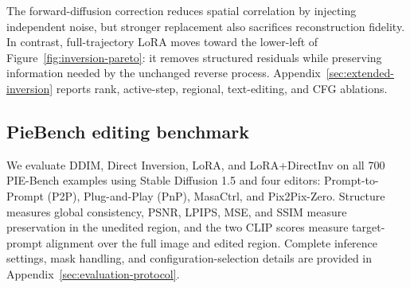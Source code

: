 \documentclass{article} %
\begin{document}
The forward-diffusion correction reduces spatial correlation by injecting independent noise, but stronger replacement also sacrifices reconstruction fidelity. In contrast, full-trajectory LoRA moves toward the lower-left of Figure~\ref{fig:inversion-pareto}: it removes structured residuals while preserving information needed by the unchanged reverse process. Appendix~\ref{sec:extended-inversion} reports rank, active-step, regional, text-editing, and CFG ablations.
\subsection{PieBench editing benchmark}
We evaluate DDIM, Direct Inversion, LoRA, and LoRA+DirectInv on all 700 PIE-Bench examples using Stable Diffusion 1.5 and four editors: Prompt-to-Prompt (P2P), Plug-and-Play (PnP), MasaCtrl, and Pix2Pix-Zero. Structure measures global consistency, PSNR, LPIPS, MSE, and SSIM measure preservation in the unedited region, and the two CLIP scores measure target-prompt alignment over the full image and edited region. Complete inference settings, mask handling, and configuration-selection details are provided in Appendix~\ref{sec:evaluation-protocol}.
\end{document}
